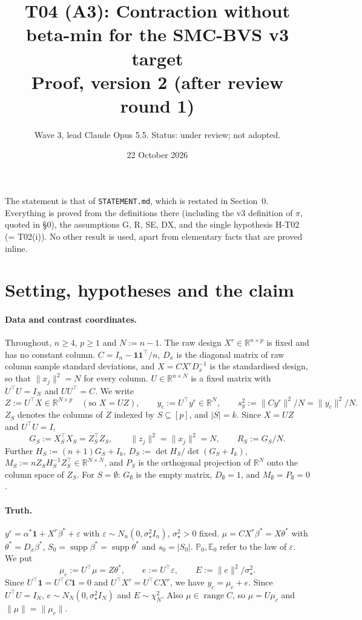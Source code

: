 \documentclass[11pt]{article}
\title{T04 (A3): Contraction without beta-min for the SMC-BVS v3 target\\[2pt]\large Proof, version 2 (after review round 1)}
\author{Wave 3, lead Claude Opus 5.5. Status: under review; not adopted.}
\date{22 October 2026}
\theoremstyle{remark}
\newcommand{\R}{\mathbb R}
\newcommand{\E}{\mathbb E}
\renewcommand{\P}{\mathbb P}
\newcommand{\ve}{\varepsilon}
\newcommand{\sst}{\sigma_\star}
\begin{document}
\maketitle

\noindent The statement is that of \texttt{STATEMENT.md}, which is restated in Section~0. Everything is proved from the definitions there (including the v3 definition of $\pi$, quoted in \S0), the assumptions G, R, SE, DX, and the single hypothesis H-T02 (= T02(i)). No other result is used, apart from elementary facts that are proved inline.

\tableofcontents

\setcounter{section}{-1}
\section{Setting, hypotheses and the claim}\label{sec:setting}

\paragraph{Data and contrast coordinates.} Throughout, $n\ge4$, $p\ge1$ and $N:=n-1$. The raw design $X^r\in\R^{n\times p}$ is fixed and has no constant column. $C=I_n-\mathbf 1\mathbf 1^\top/n$, $D_x$ is the diagonal matrix of raw column sample standard deviations, and $X=CX^rD_x^{-1}$ is the standardised design, so that $\|x_j\|^2=N$ for every column. $U\in\R^{n\times N}$ is a fixed matrix with $U^\top U=I_N$ and $UU^\top=C$. We write
\[
Z:=U^\top X\in\R^{N\times p}\quad(\text{so }X=UZ),\qquad y_c:=U^\top y^r\in\R^N,\qquad s_y^2:=\|Cy^r\|^2/N=\|y_c\|^2/N .
\]
$Z_S$ denotes the columns of $Z$ indexed by $S\subseteq[p]$, and $|S|=k$. Since $X=UZ$ and $U^\top U=I$,
\[
G_S:=X_S^\top X_S=Z_S^\top Z_S,\qquad \|z_j\|^2=\|x_j\|^2=N,\qquad R_S:=G_S/N .
\]
Further $H_S:=(n+1)G_S+I_k$, $D_S:=\det H_S/\det(G_S+I_k)$, $M_S:=nZ_SH_S^{-1}Z_S^\top\in\R^{N\times N}$, and $P_S$ is the orthogonal projection of $\R^N$ onto the column space of $Z_S$. For $S=\emptyset$: $G_\emptyset$ is the empty matrix, $D_\emptyset=1$, and $M_\emptyset=P_\emptyset=0$.

\paragraph{Truth.} $y^r=\alpha^\ast\mathbf 1+X^r\beta^\ast+\ve$ with $\ve\sim N_n(0,\sst^2I_n)$, $\sst^2>0$ fixed. $\mu=CX^r\beta^\ast=X\theta^\ast$ with $\theta^\ast=D_x\beta^\ast$, $S_0=\operatorname{supp}\beta^\ast=\operatorname{supp}\theta^\ast$ and $s_0=|S_0|$. $\P_0,\E_0$ refer to the law of $\ve$. We put
\[
\mu_c:=U^\top\mu=Z\theta^\ast,\qquad e:=U^\top\ve,\qquad E:=\|e\|^2/\sst^2 .
\]
Since $U^\top\mathbf 1=U^\top C\mathbf 1=0$ and $U^\top X^r=U^\top CX^r$, we have $y_c=\mu_c+e$. Since $U^\top U=I_N$, $e\sim N_N(0,\sst^2I_N)$ and $E\sim\chi^2_N$. Also $\mu\in\operatorname{range}C$, so $\mu=U\mu_c$ and $\|\mu\|=\|\mu_c\|$.
\end{document}
